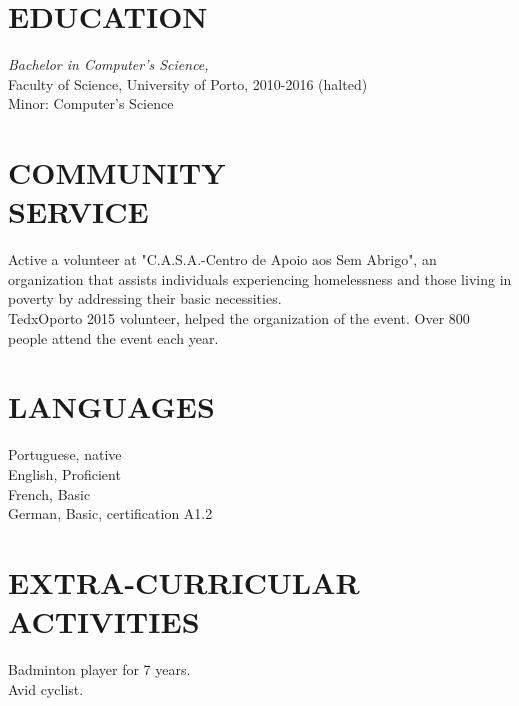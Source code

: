 \documentclass[margin, 10pt]{res} %
\begin{document}
\begin{resume}

    \section{EDUCATION}

     {\sl Bachelor in Computer's Science,} \\
    Faculty of Science, University of Porto, 2010-2016 (halted)  \\
    Minor: Computer's Science


    \section{COMMUNITY \\ SERVICE}

    Active a volunteer at "C.A.S.A.-Centro de Apoio aos Sem Abrigo", an organization that assists individuals experiencing homelessness and those living in poverty by addressing their basic necessities.\\
    TedxOporto 2015 volunteer, helped the organization of the event. Over 800 people attend the event each year.

    \section{LANGUAGES}
    Portuguese, native\\
    English, Proficient\\
    French, Basic\\
    German, Basic, certification A1.2


    \section{EXTRA-CURRICULAR \\ ACTIVITIES}
    Badminton player for 7 years.\\
    Avid cyclist.


\end{resume}
\end{document}
